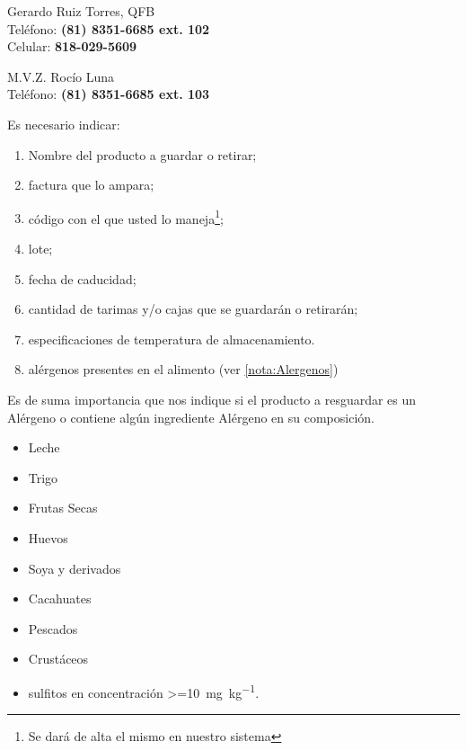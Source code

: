 \begin{contact} \label{contact:Gerente}
	Gerardo Ruiz Torres, QFB\\
	Teléfono: \textbf{(81) 8351-6685 ext. 102}\\
	Celular: \textbf{818-029-5609}\\
\end{contact}

\begin{contact} \label{contact:MedicoTIF}
	M.V.Z. Rocío Luna\\
	Teléfono: \textbf{(81) 8351-6685 ext. 103}\\
\end{contact}

Es necesario indicar:
\begin{enumerate}
	\item Nombre del producto a guardar o retirar;
	\item factura que lo ampara;
	\item código con el que usted lo maneja\footnote{Se dará de alta el mismo en nuestro sistema};
	\item lote;
	\item fecha de caducidad;
	\item cantidad de tarimas y/o cajas que se guardarán o retirarán;
	\item especificaciones de temperatura de almacenamiento.
	\item alérgenos presentes en el \gls{alimento} (ver \cref{nota:Alergenos})
\end{enumerate}

\begin{note} \label{nota:Alergenos}
	Es de suma importancia que nos indique si el producto a resguardar es un Alérgeno o contiene algún ingrediente Alérgeno en su composición.
	\begin{itemize}
		\item Leche
		\item Trigo
		\item Frutas Secas
		\item Huevos
		\item Soya y derivados
		\item Cacahuates
		\item Pescados
		\item Crustáceos
		\item sulfitos en concentración \qty{>=10}{\milli\gram\per\kilo\gram}.
	\end{itemize}
\end{note}

